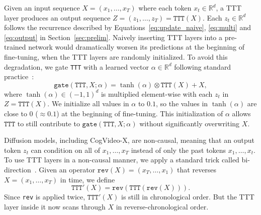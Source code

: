 Given an input sequence $X = (x_1, \dots, x_T)$ where each token $x_t\in\mathbb{R}^d$, a TTT layer produces an output sequence $Z = (z_1, \dots, z_T) = \texttt{TTT}(X)$.
Each $z_t\in\mathbb{R}^d$ follows the recurrence described by Equations~\ref{eq:update_naive}, \ref{eq:multi} and \ref{eq:output} in Section~\ref{sec:prelim}.
Naively inserting TTT layers into a pre-trained network would dramatically worsen its predictions at the beginning of fine-tuning, when the TTT layers are randomly initialized.
To avoid this degradation, we gate \texttt{TTT} 
with a learned vector $\alpha\in\mathbb{R}^d$ following standard practice~\cite{alayrac2022flamingo}:
\begin{equation}
\texttt{gate}(\texttt{TTT}, X; \alpha) = \tanh(\alpha) \otimes \texttt{TTT}(X) + X,
\end{equation}
where $\tanh(\alpha)\in(-1, 1)^d$ is multiplied element-wise with each $z_t$ in $Z = \texttt{TTT}(X)$.
We initialize all values in $\alpha$ to $0.1$, so the values in $\tanh(\alpha)$ are close to 0 ($\approx 0.1$) at the beginning of fine-tuning.
This initialization of $\alpha$ allows $\texttt{TTT}$ to still contribute to $\texttt{gate}(\texttt{TTT}, X; \alpha)$ without significantly overwriting $X$.

Diffusion models, including CogVideo-X, are non-causal, meaning that an output token $z_t$ can condition on all of $x_1, \dots, x_T$ instead of only the past tokens $x_1,\dots, x_t$.
To use TTT layers in a non-causal manner, we apply a standard trick called bi-direction~\cite{mo2024scalingdiffusionmambabidirectional}. Given an operator $\texttt{rev}(X) = (x_T, \dots, x_1)$ that reverses $X = (x_1, \dots, x_T)$ in time, we define 
\begin{equation}
\texttt{TTT}'(X) = \texttt{rev}(\texttt{TTT}(\texttt{rev}(X))).
\end{equation}
Since \texttt{rev} is applied twice, $\texttt{TTT}'(X)$ is still in chronological order.
But the TTT layer inside it now scans through $X$ in reverse-chronological order.


